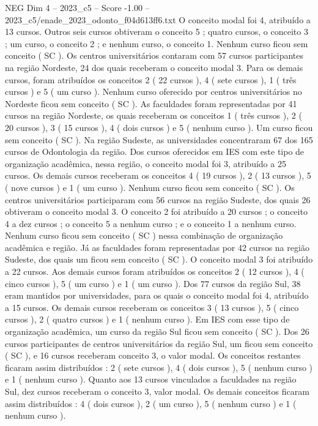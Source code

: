 \begin{textsample}{NEG Dim 4 – 2023\_c5 – Score -1.00 – 2023\_c5/enade\_2023\_odonto\_f04d613ff6.txt}
O conceito modal foi 4, atribuído a 13 cursos.
Outros seis cursos obtiveram o conceito 5 ; quatro cursos, o conceito 3 ; um curso, o conceito 2 ; e nenhum curso, o conceito 1.
Nenhum curso ficou sem conceito ( SC ).
Os centros universitários contaram com 57 cursos participantes na região Nordeste, 24 dos quais receberam o conceito modal 3.
Para os demais cursos, foram atribuídos os conceitos 2 ( 22 cursos ), 4 ( sete cursos ), 1 ( três cursos ) e 5 ( um curso ).
Nenhum curso oferecido por centros universitários no Nordeste ficou sem conceito ( SC ).
As faculdades foram representadas por 41 cursos na região Nordeste, os quais receberam os conceitos 1 ( três cursos ), 2 ( 20 cursos ), 3 ( 15 cursos ), 4 ( dois cursos ) e 5 ( nenhum curso ).
Um curso ficou sem conceito ( SC ).
Na região Sudeste, as universidades concentraram 67 dos 165 cursos de Odontologia da região.
Dos cursos oferecidos em IES com este tipo de organização acadêmica, nessa região, o conceito modal foi 3, atribuído a 25 cursos.
Os demais cursos receberam os conceitos 4 ( 19 cursos ), 2 ( 13 cursos ), 5 ( nove cursos ) e 1 ( um curso ).
Nenhum curso ficou sem conceito ( SC ).
Os centros universitários participaram com 56 cursos na região Sudeste, dos quais 26 obtiveram o conceito modal 3.
O conceito 2 foi atribuído a 20 cursos ; o conceito 4 a dez cursos ; o conceito 5 a nenhum curso ; e o conceito 1 a nenhum curso.
Nenhum curso ficou sem conceito ( SC ) nessa combinação de organização acadêmica e região.
Já as faculdades foram representadas por 42 cursos na região Sudeste, dos quais um ficou sem conceito ( SC ).
O conceito modal 3 foi atribuído a 22 cursos.
Aos demais cursos foram atribuídos os conceitos 2 ( 12 cursos ), 4 ( cinco cursos ), 5 ( um curso ) e 1 ( um curso ).
Dos 77 cursos da região Sul, 38 eram mantidos por universidades, para os quais o conceito modal foi 4, atribuído a 15 cursos.
Os demais cursos receberam os conceitos 3 ( 13 cursos ), 5 ( cinco cursos ), 2 ( quatro cursos ) e 1 ( nenhum curso ).
Em IES com esse tipo de organização acadêmica, um curso da região Sul ficou sem conceito ( SC ).
Dos 26 cursos participantes de centros universitários da região Sul, um ficou sem conceito ( SC ), e 16 cursos receberam conceito 3, o valor modal.
Os conceitos restantes ficaram assim distribuídos : 2 ( sete cursos ), 4 ( dois cursos ), 5 ( nenhum curso ) e 1 ( nenhum curso ).
Quanto aos 13 cursos vinculados a faculdades na região Sul, dez cursos receberam o conceito 3, valor modal.
Os demais conceitos ficaram assim distribuídos : 4 ( dois cursos ), 2 ( um curso ), 5 ( nenhum curso ) e 1 ( nenhum curso ).

\end{textsample}

